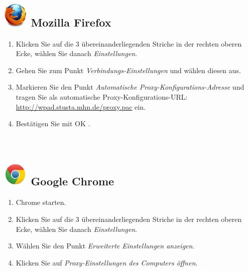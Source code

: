\documentclass[a4paper,12pt]{scrartcl}
\begin{document}
\subsection*{\includegraphics[height=1.2cm,keepaspectratio]{Bilder/Firefox_35_logo} Mozilla Firefox}
\begin{enumerate}
	\item Klicken Sie auf die 3 übereinanderliegenden Striche in der rechten oberen Ecke, wählen Sie danach \emph{Einstellungen}.
	\item Gehen Sie zum Punkt \emph{Verbindungs-Einstellungen} und wählen diesen aus.
	\item Markieren Sie den Punkt \emph{Automatische Proxy-Konfigurations-Adresse} und tragen Sie als automatische Proxy-Konfigurations-URL: \\ \url{http://wpad.stusta.mhn.de/proxy.pac} ein.
	\item Bestätigen Sie mit OK .\\
	\\
	\\
\end{enumerate}




\subsection*{\includegraphics[height=1.2cm,keepaspectratio]{Bilder/Chrome_2011_logo} Google Chrome}
\begin{enumerate}
	\item Chrome starten.
	\item Klicken Sie auf die 3 übereinanderliegenden Striche in der rechten oberen Ecke, wählen Sie danach \emph{Einstellungen}.
	\item Wählen Sie den Punkt \emph{Erweiterte Einstellungen anzeigen}.
	\item Klicken Sie auf \emph{Proxy-Einstellungen des Computers öffnen}.
	\\
	\\
\end{enumerate}
\end{document}
